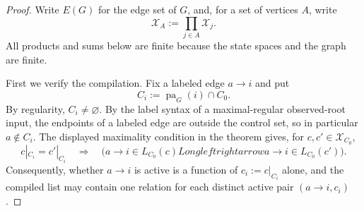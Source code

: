 \documentclass{article}
\begin{document}
\begin{proof}
Write \(E(G)\) for the edge set of \(G\), and, for a set of vertices \(A\), write
\[
\mathcal X_A:=\prod_{j\in A}\mathcal X_j.
\]
All products and sums below are finite because the state spaces and the graph are finite.

First we verify the compilation.  Fix a labeled edge \(a\to i\) and put
\[
C_i:=\operatorname{pa}_G(i)\cap C_0.
\]
By regularity, \(C_i\ne\varnothing\).  By the label syntax of a maximal-regular observed-root input, the endpoints of a labeled edge are outside the control set, so in particular \(a\notin C_i\).  The displayed maximality condition in the theorem gives, for \(c,c'\in\mathcal X_{C_0}\),
\[
c|_{C_i}=c'|_{C_i}
\quad\Longrightarrow\quad
\bigl(a\to i\in L_{C_0}(c)Longleftrightarrow
      a\to i\in L_{C_0}(c')\bigr).
\tag{1}
\]
Consequently, whether \(a\to i\) is active is a function of \(c_i:=c|_{C_i}\) alone, and the compiled list may contain one relation for each distinct active pair \((a\to i,c_i)\).


\end{proof}
\end{document}
